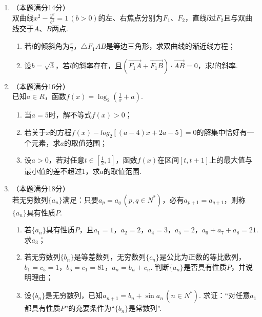 \documentclass[12pt,space]{ctexart} %
\begin{document}
\begin{enumerate}[itemsep=-0.3em,topsep=0pt, resume]
    \item （本题满分14分）\\
    双曲线$\displaystyle{x^2-\frac{y^2}{b^2}=1\,(b>0)}$的左、右焦点分别为$F_1$、$F_2$，直线$l$过$F_2$且与双曲线交于$A$、$B$两点. 
    \begin{enumerate}[itemsep=-0.3em,label={(\arabic*)},topsep=0pt,labelsep=.5em,leftmargin=1.7em]
      \item 若$l$的倾斜角为$\displaystyle{\frac{\pi}{2}}$，$\triangle F_1AB$是等边三角形，求双曲线的渐近线方程；
      \item 设$b=\sqrt{3}$，若$l$的斜率存在，且$(\overrightarrow{F_1A}+\overrightarrow{F_1B})\cdot\overrightarrow{AB}=0$，求$l$的斜率.
    \end{enumerate}

    \item （本题满分16分）\\
    已知$a\in R$，函数$\displaystyle{f(x)=\log_2(\frac{1}{x}+a)}$.
    \begin{enumerate}[itemsep=-0.3em,label={(\arabic*)},topsep=0pt,labelsep=.5em,leftmargin=1.7em]
      \item 当$a=5$时，解不等式$f(x)>0$；
      \item 若关于$x$的方程$f(x)-log_2[(a-4)x+2a-5]=0$的解集中恰好有一个元素，求$a$的取值范围；
      \item 设$a>0$，若对任意$\displaystyle{t\in [\frac{1}{2}, 1]}$，函数$f(x)$在区间$[t, t+1]$上的最大值与最小值的差不超过1，求$a$的取值范围.
    \end{enumerate}

    \item （本题满分18分）\\
    若无穷数列$\{a_n\}$满足：只要$a_p=a_q\,(p,q\in N^*)$，必有$a_{p+1}=a_{q+1}$，则称$\{a_n\}$具有性质$P$.
    \begin{enumerate}[itemsep=-0.3em,label={(\arabic*)},topsep=0pt,labelsep=.5em,leftmargin=1.7em]
      \item 若$\{a_n\}$具有性质$P$，且$a_1=1$，$a_2=2$，$a_4=3$，$a_5=2$，$a_6+a_7+a_8=21$. 求$a_3$；
      \item 若无穷数列$\{b_n\}$是等差数列，无穷数列$\{c_n\}$是公比为正数的等比数列，$b_1=c_5=1$，$b_5=c_1=81$，$a_n=b_n+c_n$.
            判断$\{a_n\}$是否具有性质$P$，并说明理由；
      \item 设$\{b_n\}$是无穷数列，已知$a_{n+1}=b_n+\sin a_n\,(n\in N^*)$. 求证：“对任意$a_1$都具有性质$P$”的充要条件为“$\{b_n\}$是常数列”.
    \end{enumerate}

\end{enumerate}

\clearpage
\end{document}
